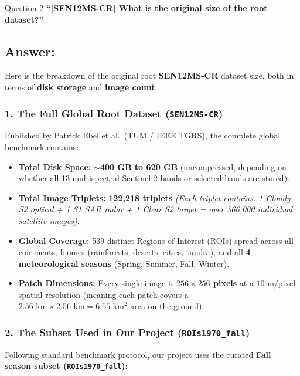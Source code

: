 \documentclass[11pt,a4paper]{article}
\begin{document}
\begin{questionbox}{Question 2}
\textbf{``[SEN12MS-CR] What is the original size of the root dataset?''}
\end{questionbox}

\subsection*{Answer:}
Here is the breakdown of the original root \textbf{SEN12MS-CR} dataset size, both in terms of \textbf{disk storage} and \textbf{image count}:

\subsubsection*{1. The Full Global Root Dataset (\texttt{SEN12MS-CR})}
Published by Patrick Ebel et al.\ (TUM / IEEE TGRS), the complete global benchmark contains:
\begin{itemize}[leftmargin=1.5em]
    \item \textbf{Total Disk Space:} \textbf{$\sim$400 GB to 620 GB} (uncompressed, depending on whether all 13 multispectral Sentinel-2 bands or selected bands are stored).
    \item \textbf{Total Image Triplets:} \textbf{122,218 triplets} \textit{(Each triplet contains: 1 Cloudy S2 optical + 1 S1 SAR radar + 1 Clear S2 target = over 366,000 individual satellite images)}.
    \item \textbf{Global Coverage:} 539 distinct Regions of Interest (ROIs) spread across all continents, biomes (rainforests, deserts, cities, tundra), and all \textbf{4 meteorological seasons} (Spring, Summer, Fall, Winter).
    \item \textbf{Patch Dimensions:} Every single image is \textbf{$256 \times 256$ pixels} at a $10\text{ m/pixel}$ spatial resolution (meaning each patch covers a \textbf{$2.56\text{ km} \times 2.56\text{ km} = 6.55\text{ km}^2$} area on the ground).
\end{itemize}

\subsubsection*{2. The Subset Used in Our Project (\texttt{ROIs1970\_fall})}
Following standard benchmark protocol, our project uses the curated \textbf{Fall season subset (\texttt{ROIs1970\_fall})}:
\end{document}
